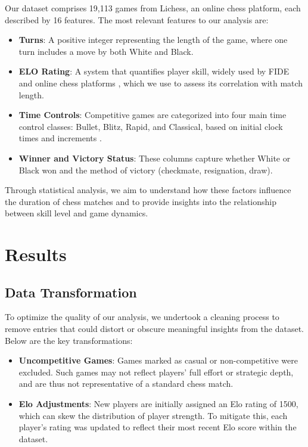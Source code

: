 \documentclass[conference]{IEEEtran}
\begin{document}
Our dataset \cite{dataset} comprises 19,113 games from Lichess, an online chess platform, each described by 16 features. The most relevant features to our analysis are: \begin{itemize} \item \textbf{Turns}: A positive integer representing the length of the game, where one turn includes a move by both White and Black. \item \textbf{ELO Rating}: A system that quantifies player skill, widely used by FIDE and online chess platforms \cite{ELO}, which we use to assess its correlation with match length. \item \textbf{Time Controls}: Competitive games are categorized into four main time control classes: Bullet, Blitz, Rapid, and Classical, based on initial clock times and increments \cite{time}. \item \textbf{Winner and Victory Status}: These columns capture whether White or Black won and the method of victory (checkmate, resignation, draw). \end{itemize} Through statistical analysis, we aim to understand how these factors influence the duration of chess matches and to provide insights into the relationship between skill level and game dynamics. 

\section{Results}
\subsection{Data Transformation}

To optimize the quality of our analysis, we undertook a cleaning process to remove entries that could distort or obscure meaningful insights from the dataset. Below are the key transformations:

\begin{itemize}
    \item \textbf{Uncompetitive Games}: Games marked as casual or non-competitive were excluded. Such games may not reflect players' full effort or strategic depth, and are thus not representative of a standard chess match.   
 
    \item \textbf{Elo Adjustments}: New players are initially assigned an Elo rating of 1500, which can skew the distribution of player strength. To mitigate this, each player's rating was updated to reflect their most recent Elo score within the dataset.
\end{itemize}
\end{document}
